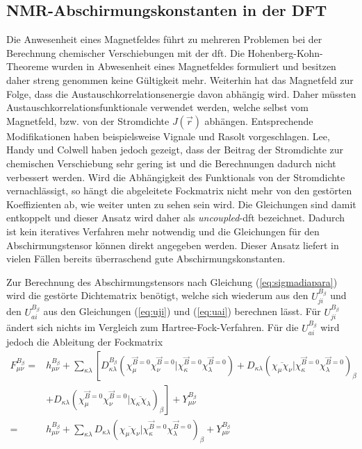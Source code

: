 \subsection{NMR-Abschirmungskonstanten in der DFT}    
	Die Anwesenheit eines Magnetfeldes führt zu mehreren Problemen bei der Berechnung chemischer Verschiebungen mit der \ac{dft}. Die Hohenberg-Kohn-Theoreme wurden in Abwesenheit eines Magnetfeldes formuliert und besitzen daher streng genommen keine Gültigkeit mehr.\supercite{rajagopal1973inhomogeneous,vignale1988current} Weiterhin hat das Magnetfeld zur Folge, dass die Austauschkorrelationsenergie davon abhängig wird.\supercite{buhl1999dft} Daher müssten Austauschkorrelationsfunktionale verwendet werden, welche selbst vom Magnetfeld, bzw. von der Stromdichte $J(\vec{r})$ abhängen. Entsprechende Modifikationen haben beispielsweise Vignale und Rasolt vorgeschlagen.\supercite{vignale1988current,vignale1987density} Lee, Handy und Colwell \supercite{lee1995density} haben jedoch gezeigt, dass der Beitrag der Stromdichte zur chemischen Verschiebung sehr gering ist und die Berechnungen dadurch nicht verbessert werden. Wird die Abhängigkeit des Funktionals von der Stromdichte vernachlässigt, so hängt die abgeleitete Fockmatrix nicht mehr von den gestörten Koeffizienten ab, wie weiter unten zu sehen sein wird. Die Gleichungen sind damit entkoppelt und dieser Ansatz wird daher als \textit{uncoupled}-\ac{dft} bezeichnet.\supercite{bieger1985lcao,malkin1993calculations} Dadurch ist kein iteratives Verfahren mehr notwendig und die Gleichungen für den Abschirmungstensor können direkt angegeben werden.  Dieser Ansatz liefert in vielen Fällen bereits überraschend gute Abschirmungskonstanten.\supercite{buhl1999dft}
	
\bigskip
Zur Berechnung des Abschirmungstensors nach Gleichung (\ref{eq:sigmadiapara}) wird die gestörte Dichtematrix benötigt, welche sich wiederum aus den $U_{ji}^{B_\beta}$ und den $U_{ai}^{B_\beta}$ aus den Gleichungen (\ref{eq:uji}) und (\ref{eq:uai}) berechnen lässt. Für $U_{ji}^{B_\beta}$ ändert sich nichts im Vergleich zum Hartree-Fock-Verfahren. Für die $U_{ai}^{B_\beta}$ wird jedoch die Ableitung der Fockmatrix 
    \begin{equation}\label{eq:fmunudbdft}
    \begin{aligned}
    F_{\mu\nu}^{B_\beta}=&h_{\mu\nu}^{B_\beta}+\sum_{\kappa\lambda}\left[D_{\kappa\lambda}^{B_\beta}\left(\chi_\mu^{\vec{B}=0}\chi_\nu^{\vec{B}=0}\vert\chi_\kappa^{\vec{B}=0}\chi_\lambda^{\vec{B}=0}\right)+D_{\kappa\lambda}\left(\overline{\chi_\mu\chi_\nu}\vert\chi_\kappa^{\vec{B}=0}\chi_\lambda^{\vec{B}=0}\right)_{\beta}\right.\\
    &+\left.D_{\kappa\lambda}\left(\chi_\mu^{\vec{B}=0}\chi_\nu^{\vec{B}=0}\vert\overline{\chi_\kappa\chi_\lambda}\right)_{\beta}\right]+Y_{\mu\nu}^{B_\beta}\\
    =&h_{\mu\nu}^{B_\beta}+\sum_{\kappa\lambda}D_{\kappa\lambda}\left(\overline{\chi_\mu\chi_\nu}\vert\chi_\kappa^{\vec{B}=0}\chi_\lambda^{\vec{B}=0}\right)_{\beta}+Y_{\mu\nu}^{B_\beta}
    \end{aligned}
    \end{equation}

